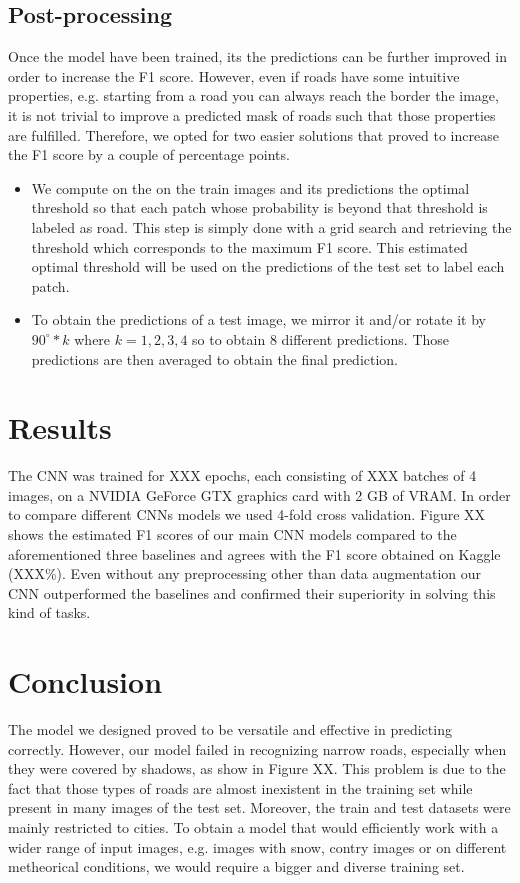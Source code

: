 \documentclass[10pt,conference,compsocconf]{IEEEtran}
\begin{document}
\subsection{Post-processing}
Once the model have been trained, its the predictions can be further improved in order to increase the F1 score. However, even if roads have some intuitive properties, e.g. starting from a road you can always reach the border the image, it is not trivial to improve a predicted mask of roads such that those properties are fulfilled. Therefore, we opted for two easier solutions that proved to increase the F1 score by a couple of percentage points. 
\begin{itemize}
	\item We compute on the on the train images and its predictions the optimal threshold so that each patch whose probability is beyond that threshold is labeled as road. This step is simply done with a grid search and retrieving the threshold which corresponds to the maximum F1 score. This estimated optimal threshold will be used on the predictions of the test set to label each patch.
	\item To obtain the predictions of a test image, we mirror it and/or rotate it by $90^\circ*k$ where $k=1,2,3,4$ so to obtain 8 different predictions. Those predictions are then averaged to obtain the final prediction.
\end{itemize}

\section{Results}
\label{sec:results}
The CNN was trained for XXX epochs, each consisting of XXX batches of 4 images, on a NVIDIA GeForce GTX graphics card with 2 GB of VRAM. In order to compare different CNNs models we used 4-fold cross validation. Figure XX shows the estimated F1 scores of our main CNN models compared to the aforementioned three baselines and agrees with the F1 score obtained on Kaggle (XXX\%). Even without any preprocessing other than data augmentation our CNN outperformed the baselines and confirmed their superiority in solving this kind of tasks.

\section{Conclusion}
\label{sec:conclusion}
The model we designed proved to be versatile and effective in predicting correctly. However, our model failed in recognizing narrow roads, especially when they were covered by shadows, as show in Figure XX. This problem is due to the fact that those types of roads are almost inexistent in the training set while present in many images of the test set. Moreover, the train and test datasets were mainly restricted to cities. To obtain a model that would efficiently work with a wider range of input images, e.g. images with snow, contry images or on different metheorical conditions, we would require a bigger and diverse training set. 
\end{document}
